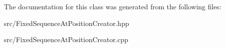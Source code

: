 The documentation for this class was generated from the following files\+:\begin{DoxyCompactItemize}
\item 
src/Fixed\+Sequence\+At\+Position\+Creator.\+hpp\item 
src/Fixed\+Sequence\+At\+Position\+Creator.\+cpp\end{DoxyCompactItemize}
